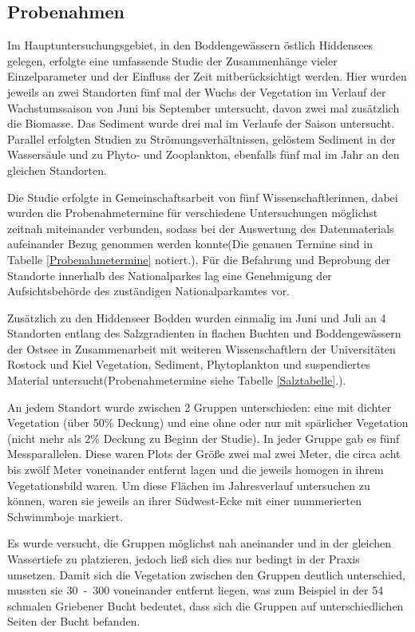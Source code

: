 \subsection{Probenahmen}

Im Hauptuntersuchungsgebiet, in den Boddengewässern östlich Hiddensees gelegen, erfolgte eine umfassende Studie der Zusammenhänge vieler Einzelparameter und der Einfluss der Zeit mitberücksichtigt werden. Hier wurden jeweils an zwei Standorten fünf mal der Wuchs der Vegetation im Verlauf der Wachstumssaison von Juni bis September untersucht, davon zwei mal zusätzlich die Biomasse. Das Sediment wurde drei mal im Verlaufe der Saison untersucht. Parallel erfolgten Studien zu Strömungsverhältnissen, gelöstem Sediment in der Wassersäule und zu Phyto- und Zooplankton, ebenfalls fünf mal im Jahr an den gleichen Standorten.

Die Studie erfolgte in Gemeinschaftsarbeit von fünf Wissenschaftlerinnen, dabei wurden die Probenahmetermine für verschiedene Untersuchungen möglichst zeitnah miteinander verbunden, sodass bei der Auswertung des Datenmaterials aufeinander Bezug genommen werden konnte(Die genauen Termine sind in Tabelle \ref{Probenahmetermine} notiert.). Für die Befahrung und Beprobung der Standorte innerhalb des Nationalparkes lag eine Genehmigung der Aufsichtsbehörde des zuständigen Nationalparkamtes vor.

Zusätzlich zu den Hiddenseer Bodden wurden einmalig im Juni und Juli an 4 Standorten entlang des Salzgradienten in flachen Buchten und Boddengewässern der Ostsee  in Zusammenarbeit mit weiteren Wissenschaftlern der Universitäten Rostock und Kiel Vegetation, Sediment, Phytoplankton und suspendiertes Material untersucht(Probenahmetermine siehe Tabelle \ref{Salztabelle}.).

An jedem Standort wurde zwischen 2 Gruppen unterschieden: eine mit dichter Vegetation (über \unit{50}{\%} Deckung) und eine ohne oder nur mit spärlicher Vegetation (nicht mehr als \unit{2}{\%} Deckung zu Beginn der Studie). In jeder Gruppe gab es fünf Messparallelen. Diese waren Plots der Größe zwei mal zwei Meter, die circa acht bis zwölf Meter voneinander entfernt lagen und die jeweils homogen in ihrem Vegetationsbild waren. Um diese Flächen im Jahresverlauf untersuchen zu können, waren sie jeweils an ihrer Südwest-Ecke mit einer nummerierten Schwimmboje markiert.

Es wurde versucht, die Gruppen möglichst nah aneinander und in der gleichen Wassertiefe zu platzieren, jedoch ließ sich dies nur bedingt in der Praxis umsetzen. Damit sich die Vegetation zwischen den Gruppen deutlich unterschied, mussten sie \unit{30-300}{\metre} voneinander entfernt liegen, was zum Beispiel in der \unit{54}{\metre} schmalen Griebener Bucht bedeutet, dass sich die Gruppen auf unterschiedlichen Seiten der Bucht befanden. 


